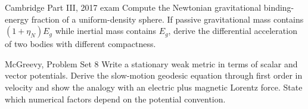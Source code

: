 \begin{exercise}{Cambridge Part III, 2017 exam}
Compute the Newtonian gravitational binding-energy fraction of a
uniform-density sphere.  If passive gravitational mass contains
\((1+\eta_N)E_g\) while inertial mass contains \(E_g\), derive the differential
acceleration of two bodies with different compactness.
\end{exercise}

\begin{exercise}{McGreevy, Problem Set 8}
Write a stationary weak metric in terms of scalar and vector potentials.
Derive the slow-motion geodesic equation through first order in velocity and
show the analogy with an electric plus magnetic Lorentz force.  State which
numerical factors depend on the potential convention.
\end{exercise}
